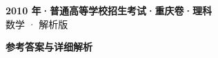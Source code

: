 \documentclass[zihao=-4, a4paper]{ctexart}
\begin{document}
\begin{center}
  {\Large\bfseries 2010 年·普通高等学校招生考试·重庆卷·理科}\\[4pt]
  {\large 数学 · 解析版}
\end{center}
\medskip
{}

\clearpage
{}
\begin{center}{\Large\bfseries 参考答案与详细解析}\end{center}
\medskip

\end{document}
